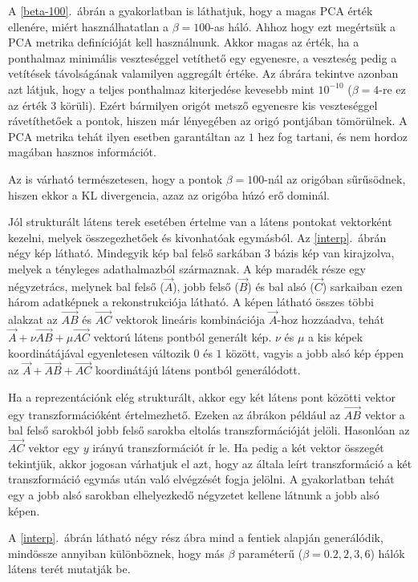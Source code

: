 A \ref{beta-100}.~ábrán a gyakorlatban is láthatjuk, hogy a magas PCA érték ellenére, miért használhatatlan a $\beta=100$-as háló.  Ahhoz hogy ezt megértsük a PCA metrika definícióját kell használnunk. Akkor magas az érték, ha a ponthalmaz minimális veszteséggel vetíthető egy egyenesre, a veszteség pedig a vetítések távolságának valamilyen aggregált értéke. Az ábrára tekintve azonban azt látjuk, hogy a teljes ponthalmaz kiterjedése kevesebb mint $10^{-10}$ ($\beta=4$-re ez az érték $3$ körüli). Ezért bármilyen origót metsző egyenesre kis veszteséggel rávetíthetőek a pontok, hiszen már lényegében az origó pontjában tömörülnek. A PCA metrika tehát ilyen esetben garantáltan az $1$ hez fog tartani, és nem hordoz magában hasznos információt.

Az is várható természetesen, hogy a pontok $\beta=100$-nál az origóban sűrűsödnek, hiszen ekkor a KL divergencia, azaz az origóba húzó erő dominál.

Jól strukturált látens terek esetében értelme van a látens pontokat vektorként kezelni, melyek összegezhetőek és kivonhatóak egymásból. Az \ref{interp}.~ábrán négy kép látható. Mindegyik kép bal felső sarkában $3$ bázis kép van kirajzolva, melyek a tényleges adathalmazból származnak. A kép maradék része egy négyzetrács, melynek bal felső ($\vec{A}$), jobb felső ($\vec{B}$) és bal alsó ($\vec{C}$) sarkaiban ezen három adatképnek a rekonstrukciója látható. A képen látható összes többi alakzat az $\vec{AB}$ és $\vec{AC}$ vektorok lineáris kombinációja $\vec{A}$-hoz hozzáadva, tehát $\vec{A}+\nu\vec{AB}+\mu\vec{AC}$ vektorú látens pontból generált kép. $\nu$ és $\mu$ a kis képek koordinátájával egyenletesen változik $0$ és $1$ között, vagyis a jobb alsó kép éppen az $\vec{A}+\vec{AB}+\vec{AC}$ koordinátájú látens pontból generálódott. 

Ha a reprezentációnk elég strukturált, akkor egy két látens pont közötti vektor egy transzformációként értelmezhető. Ezeken az ábrákon például az $\vec{AB}$ vektor a bal felső sarokból jobb felső sarokba eltolás transzformációját jelöli. Hasonlóan az $\vec{AC}$ vektor egy $y$ irányú transzformációt ír le. Ha pedig a két vektor összegét tekintjük, akkor jogosan várhatjuk el azt, hogy az általa leírt transzformáció a két transzformáció egymás után való elvégzését fogja jelölni. A gyakorlatban tehát egy a jobb alsó sarokban elhelyezkedő négyzetet kellene látnunk a jobb alsó képen.

A \ref{interp}.~ábrán látható négy rész ábra mind a fentiek alapján generálódik, mindössze annyiban különböznek, hogy más $\beta$ paraméterű ($\beta=0.2, 2,3,6$) hálók látens terét mutatják be. 

